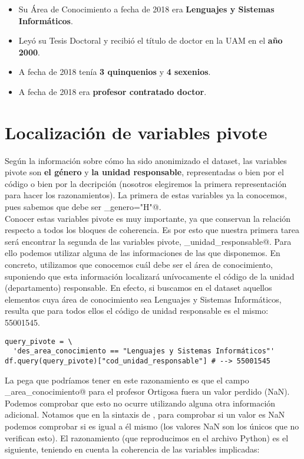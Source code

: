 \documentclass[11pt]{article}
\begin{document}
\begin{itemize}
  \item Su Área de Conocimiento a fecha de 2018 era \textbf{Lenguajes y Sistemas Informáticos}.
  \item Leyó su Tesis Doctoral y recibió el título de doctor en la UAM en el \textbf{año 2000}.
  \item A fecha de 2018 tenía \textbf{3 quinquenios} y \textbf{4 sexenios}.
  \item A fecha de 2018 era \textbf{profesor contratado doctor}.
\end{itemize}

\section{Localización de variables pivote}

Según la información sobre cómo ha sido anonimizado el dataset, las variables pivote son \textbf{el género} y \textbf{la unidad responsable}, representadas o bien por el código o bien por la decripción (nosotros elegiremos la primera representación para hacer los razonamientos). La primera de estas variables ya la conocemos, pues sabemos que debe ser \verb@cod_genero="H"@.\\

Conocer estas variables pivote es muy importante, ya que conservan la relación respecto a todos los bloques de coherencia. Es por esto que nuestra primera tarea será encontrar la segunda de las variables pivote, \verb@cod_unidad_responsable@. Para ello podemos  utilizar alguna de las informaciones de las que disponemos. En concreto, utilizamos que conocemos cuál debe ser el área de conocimiento, suponiendo que esta información localizará unívocamente el código de la unidad (departamento) responsable. En efecto, si buscamos en el dataset aquellos elementos cuya área de conocimiento sea Lenguajes y Sistemas Informáticos, resulta que para todos ellos el código de unidad responsable es el mismo: 55001545.

\begin{verbatim}
query_pivote = \
  'des_area_conocimiento == "Lenguajes y Sistemas Informáticos"'
df.query(query_pivote)["cod_unidad_responsable"] # --> 55001545
\end{verbatim}

La pega que podríamos tener en este razonamiento es que el campo \verb@des_area_conocimiento@ para el profesor Ortigosa fuera un valor perdido (NaN). Podemos comprobar que esto no ocurre utilizando alguna otra información adicional. Notamos que en la sintaxis de \verb@Pandas@, para comprobar si un valor es NaN podemos comprobar si es igual a él mismo (los valores NaN son los únicos que no verifican esto). El razonamiento (que reproducimos en el archivo Python) es el siguiente, teniendo en cuenta la coherencia de las variables implicadas:
\end{document}
